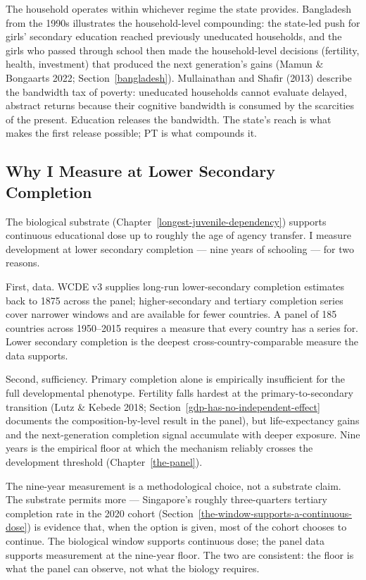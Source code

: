 \documentclass[12pt,letterpaper]{article}
\begin{document}
The household operates within whichever regime the state provides.
Bangladesh from the 1990s illustrates the household-level compounding:
the state-led push for girls' secondary education reached previously
uneducated households, and the girls who passed through school then
made the household-level decisions (fertility, health, investment)
that produced the next generation's gains (Mamun \& Bongaarts 2022;
Section~\ref{bangladesh}). Mullainathan and Shafir (2013) describe
the bandwidth tax of poverty: uneducated households cannot evaluate
delayed, abstract returns because their cognitive bandwidth is
consumed by the scarcities of the present. Education releases the
bandwidth. The state's reach is what makes the first release possible;
PT is what compounds it.

\subsection{Why I Measure at Lower Secondary Completion}\label{nine-year-measurement}

The biological substrate (Chapter~\ref{longest-juvenile-dependency})
supports continuous educational dose up to roughly the age of agency
transfer. I measure development at lower secondary
completion --- nine years of schooling --- for two reasons.

First, data. WCDE v3 supplies long-run lower-secondary completion
estimates back to 1875 across the panel; higher-secondary and
tertiary completion series cover narrower windows and are available
for fewer countries. A panel of 185 countries across 1950--2015
requires a measure that every country has a series for. Lower
secondary completion is the deepest cross-country-comparable measure
the data supports.

Second, sufficiency. Primary completion alone is empirically
insufficient for the full developmental phenotype. Fertility falls
hardest at the primary-to-secondary transition (Lutz \& Kebede 2018;
Section~\ref{gdp-has-no-independent-effect} documents the
composition-by-level result in the panel), but life-expectancy gains
and the next-generation completion signal accumulate with deeper exposure.
Nine years is the empirical floor at which the mechanism reliably
crosses the development threshold
(Chapter~\ref{the-panel}).

The nine-year measurement is a methodological choice, not a substrate
claim. The substrate permits more --- Singapore's roughly
three-quarters tertiary completion rate in the 2020 cohort
(Section~\ref{the-window-supports-a-continuous-dose}) is evidence
that, when the option is given, most of the cohort chooses to
continue. The biological window supports continuous dose; the panel
data supports measurement at the nine-year floor. The two are
consistent: the floor is what the panel can observe, not what the
biology requires.
\end{document}
